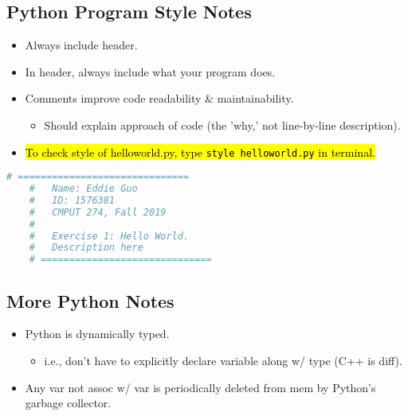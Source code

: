 \documentclass{article}
\begin{document}
\subsection{Python Program Style Notes}
    \begin{itemize}
        \item Always include header.
        \item In header, always include what your program does.
        \item Comments improve code readability \& maintainability.
            \begin{itemize}
                \item Should explain approach of code (the 'why,' not line-by-line description).
            \end{itemize}
        \item \hl{To check style of helloworld.py, type \texttt{style helloworld.py} in terminal.}
    \end{itemize}

\begin{lstlisting}[language=Python]
    # ==============================
    #   Name: Eddie Guo
    #   ID: 1576381
    #   CMPUT 274, Fall 2019
    #
    #   Exercise 1: Hello World.
    #   Description here
    # ==============================
\end{lstlisting}
    
\subsection{More Python Notes}
    \begin{itemize}
        \item Python is dynamically typed.
            \begin{itemize}
                \item i.e., don't have to explicitly declare variable along w/ type (C++ is diff).
            \end{itemize}
        \item Any var not assoc w/ var is periodically deleted from mem by Python's garbage collector.
    \end{itemize}

\end{document}
